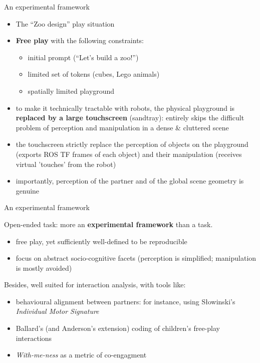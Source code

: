 \documentclass[compress]{beamer}
\begin{document}
\begin{frame}{An experimental framework}

    \begin{itemize}
        \item The ``Zoo design'' play situation
        \item {\bf Free play} with the following constraints:
            \begin{itemize}
                \item initial prompt (``Let's build a zoo!'')
                \item limited set of tokens (cubes, Lego animals)
                \item spatially limited playground
            \end{itemize}
        \item<2-> to make it technically tractable with robots, the physical
            playground is {\bf replaced by a large touchscreen} (sandtray): entirely
            skips the difficult problem of perception and manipulation in a
            dense \& cluttered scene
        \item<2-> the touchscreen strictly
            replace the perception of objects on the playground (exports
            ROS TF frames of each object) and their manipulation (receives
            virtual 'touches' from the robot)
        \item<2-> importantly, perception of the partner and of the global scene
            geometry is genuine
    \end{itemize}
\end{frame}



{
\begin{frame}{An experimental framework}

    Open-ended task: more an {\bf experimental framework} than a task.

    \begin{itemize}
        \item free play, yet sufficiently well-defined to be reproducible
        \item focus on abstract socio-cognitive facets (perception is simplified;
            manipulation is mostly avoided)
    \end{itemize}
    
    Besides, well suited for interaction analysis, with tools like:
    \begin{itemize}
        \item behavioural alignment between partners: for instance, using
            Słowinski's \emph{Individual Motor Signature}
        \item Ballard's (and Anderson's extension) coding of children's free-play interactions
        \item \emph{With-me-ness} as a metric of co-engagment
    \end{itemize}
\end{frame}
}
\end{document}
